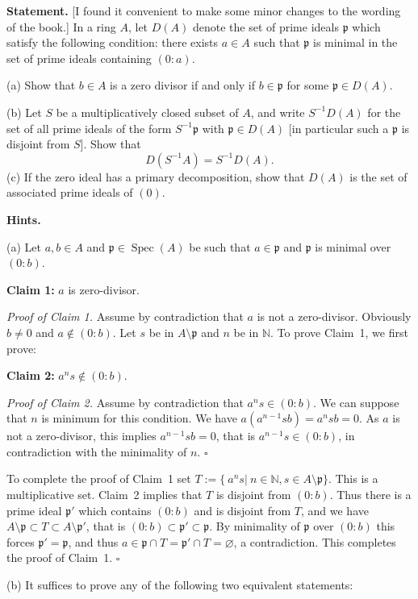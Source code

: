 \documentclass[parskip=half,fontsize=12pt]{scrartcl}%
\newcommand{\mf}{\mathfrak}
\newcommand{\ppp}{\mf p}
\newcommand{\Spec}{\operatorname{Spec}}\newcommand{\Sp}{\operatorname{Spec}}
\begin{document}
\textbf{Statement.} [I found it convenient to make some minor changes to the wording of the book.] In a ring $A$, let $D(A)$ denote the set of prime ideals $\ppp$ which satisfy the following condition: there exists $a\in A$ such that $\ppp$ is minimal in the set of prime ideals containing $(0:a)$. 

(a) Show that $b\in A$ is a zero divisor if and only if $b\in\ppp$ for some $\ppp\in D(A)$.

(b) Let $S$ be a multiplicatively closed subset of $A$, and write $S^{-1}D(A)$ for the set of all prime ideals of the form $S^{-1}\ppp$ with $\ppp\in D(A)$ [in particular such a $\ppp$ is disjoint from $S$]. Show that
$$
D(S^{-1}A)=S^{-1}D(A).
$$
(c) If the zero ideal has a primary decomposition, show that $D(A)$ is the set of associated prime ideals of $(0)$.

\textbf{Hints.} %

(a) Let $a,b\in A$ and $\ppp\in\Spec(A)$ be such that $a\in\ppp$ and $\ppp$ is minimal over $(0:b)$.

\textbf{Claim 1:} $a$ is zero-divisor.

\emph{Proof of Claim 1.} Assume by contradiction that $a$ is not a zero-divisor. Obviously $b\ne0$ and $a\notin(0:b)$. Let $s$ be in $A\setminus\ppp$ and $n$ be in $\mathbb N$. To prove Claim~1, we first prove:

\textbf{Claim 2:} $a^ns\notin(0:b)$.

\emph{Proof of Claim 2.} Assume by contradiction that $a^ns\in(0:b)$. We can suppose that $n$ is minimum for this condition. %
We have $a(a^{n-1}sb)=a^nsb=0$. As $a$ is not a zero-divisor, this implies $a^{n-1}sb=0$, that is $a^{n-1}s\in(0:b)$, in contradiction with the minimality of $n$. $\square$

To complete the proof of Claim~1 set $T:=\{\ a^ns|\ n\in\mathbb N,s\in A\setminus\ppp\}$. This is a multiplicative set. Claim~2 implies that $T$ is disjoint from $(0:b)$. Thus there is a prime ideal $\ppp'$ which contains $(0:b)$ and is disjoint from $T$, and we have $A\setminus\ppp\subset T\subset A\setminus\ppp'$, that is $(0:b)\subset\ppp'\subset\ppp$. By minimality of $\ppp$ over $(0:b)$ this forces $\ppp'=\ppp$, and thus $a\in\ppp\cap T=\ppp'\cap T=\varnothing$, a contradiction. This completes the proof of Claim~1. $\square$ 


(b) It suffices to prove any of the following two equivalent statements: 
\end{document}
